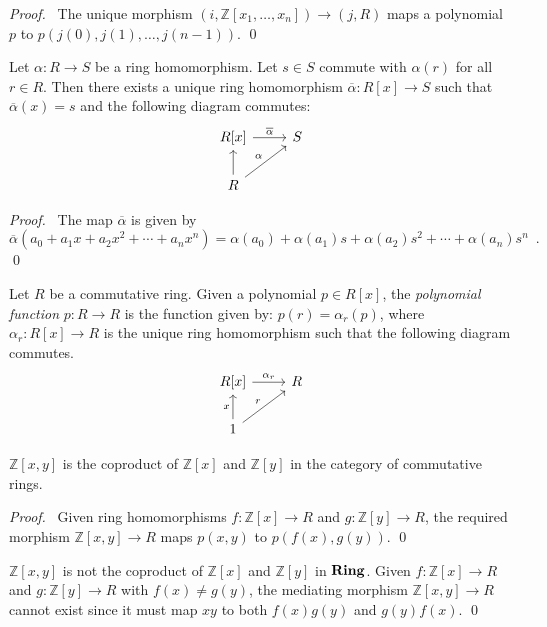 \begin{proof}
\pf\ The unique morphism $(i, \mathbb{Z}[x_1, \ldots, x_n]) \rightarrow (j, R)$ maps a polynomial $p$ to $p(j(0), j(1), \ldots, j(n-1))$. \qed
\end{proof}

\begin{prop}
Let $\alpha : R \rightarrow S$ be a ring homomorphism. Let $s \in S$ commute with $\alpha(r)$ for all $r \in R$. Then there exists a unique ring homomorphism $\overline{\alpha} : R[x] \rightarrow S$ such that $\overline{\alpha}(x) = s$ and the following diagram commutes:
\[ \begin{tikzcd}
R[x] \arrow[r,"\overline{\alpha}"] & S \\
R \arrow[u] \arrow[ur,"\alpha"]
\end{tikzcd} \]
\end{prop}

\begin{proof}
\pf\ The map $\overline{\alpha}$ is given by
\[ \overline{\alpha}(a_0 + a_1 x + a_2 x^2 + \cdots + a_n x^n) = \alpha(a_0) + \alpha(a_1) s + \alpha(a_2) s^2 + \cdots + \alpha(a_n) s^n \enspace . \]
\qed
\end{proof}

\begin{df}
Let $R$ be a commutative ring.
Given a polynomial $p \in R[x]$, the \emph{polynomial function} $p : R \rightarrow R$ is the function given by: $p(r) = \alpha_r(p)$, where $\alpha_r : R[x] \rightarrow R$ is the unique ring homomorphism such that the following diagram commutes.
\[ \begin{tikzcd}
R[x] \arrow[r,"\alpha_r"] & R \\
1 \arrow[u,"x"] \arrow[ur,"r"]
\end{tikzcd} \]
\end{df}

\begin{prop}
$\mathbb{Z}[x,y]$ is the coproduct of $\mathbb{Z}[x]$ and $\mathbb{Z}[y]$ in the category of commutative rings.
\end{prop}

\begin{proof}
\pf\ Given ring homomorphisms $f : \mathbb{Z}[x] \rightarrow R$ and $g : \mathbb{Z}[y] \rightarrow R$, the required morphism $\mathbb{Z}[x,y] \rightarrow R$ maps $p(x,y)$ to $p(f(x),g(y))$. \qed
\end{proof}

\begin{ex}
$\mathbb{Z}[x,y]$ is not the coproduct of $\mathbb{Z}[x]$ and $\mathbb{Z}[y]$ in $\mathbf{Ring}$. Given $f : \mathbb{Z}[x] \rightarrow R$ and $g : \mathbb{Z}[y] \rightarrow R$ with $f(x) \neq g(y)$, the mediating morphism $\mathbb{Z}[x,y] \rightarrow R$ cannot exist since it must map $xy$ to both $f(x)g(y)$ and $g(y)f(x)$. \qed
\end{ex}

